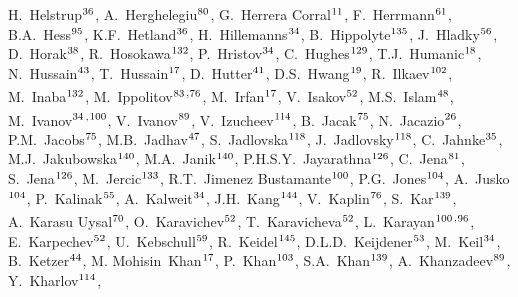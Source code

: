 \begin{flushleft}
H.~Helstrup$^\textrm{\scriptsize 36}$,
A.~Herghelegiu$^\textrm{\scriptsize 80}$,
G.~Herrera Corral$^\textrm{\scriptsize 11}$,
F.~Herrmann$^\textrm{\scriptsize 61}$,
B.A.~Hess$^\textrm{\scriptsize 95}$,
K.F.~Hetland$^\textrm{\scriptsize 36}$,
H.~Hillemanns$^\textrm{\scriptsize 34}$,
B.~Hippolyte$^\textrm{\scriptsize 135}$,
J.~Hladky$^\textrm{\scriptsize 56}$,
D.~Horak$^\textrm{\scriptsize 38}$,
R.~Hosokawa$^\textrm{\scriptsize 132}$,
P.~Hristov$^\textrm{\scriptsize 34}$,
C.~Hughes$^\textrm{\scriptsize 129}$,
T.J.~Humanic$^\textrm{\scriptsize 18}$,
N.~Hussain$^\textrm{\scriptsize 43}$,
T.~Hussain$^\textrm{\scriptsize 17}$,
D.~Hutter$^\textrm{\scriptsize 41}$,
D.S.~Hwang$^\textrm{\scriptsize 19}$,
R.~Ilkaev$^\textrm{\scriptsize 102}$,
M.~Inaba$^\textrm{\scriptsize 132}$,
M.~Ippolitov$^\textrm{\scriptsize 83}$\textsuperscript{,}$^\textrm{\scriptsize 76}$,
M.~Irfan$^\textrm{\scriptsize 17}$,
V.~Isakov$^\textrm{\scriptsize 52}$,
M.S.~Islam$^\textrm{\scriptsize 48}$,
M.~Ivanov$^\textrm{\scriptsize 34}$\textsuperscript{,}$^\textrm{\scriptsize 100}$,
V.~Ivanov$^\textrm{\scriptsize 89}$,
V.~Izucheev$^\textrm{\scriptsize 114}$,
B.~Jacak$^\textrm{\scriptsize 75}$,
N.~Jacazio$^\textrm{\scriptsize 26}$,
P.M.~Jacobs$^\textrm{\scriptsize 75}$,
M.B.~Jadhav$^\textrm{\scriptsize 47}$,
S.~Jadlovska$^\textrm{\scriptsize 118}$,
J.~Jadlovsky$^\textrm{\scriptsize 118}$,
C.~Jahnke$^\textrm{\scriptsize 35}$,
M.J.~Jakubowska$^\textrm{\scriptsize 140}$,
M.A.~Janik$^\textrm{\scriptsize 140}$,
P.H.S.Y.~Jayarathna$^\textrm{\scriptsize 126}$,
C.~Jena$^\textrm{\scriptsize 81}$,
S.~Jena$^\textrm{\scriptsize 126}$,
M.~Jercic$^\textrm{\scriptsize 133}$,
R.T.~Jimenez Bustamante$^\textrm{\scriptsize 100}$,
P.G.~Jones$^\textrm{\scriptsize 104}$,
A.~Jusko$^\textrm{\scriptsize 104}$,
P.~Kalinak$^\textrm{\scriptsize 55}$,
A.~Kalweit$^\textrm{\scriptsize 34}$,
J.H.~Kang$^\textrm{\scriptsize 144}$,
V.~Kaplin$^\textrm{\scriptsize 76}$,
S.~Kar$^\textrm{\scriptsize 139}$,
A.~Karasu Uysal$^\textrm{\scriptsize 70}$,
O.~Karavichev$^\textrm{\scriptsize 52}$,
T.~Karavicheva$^\textrm{\scriptsize 52}$,
L.~Karayan$^\textrm{\scriptsize 100}$\textsuperscript{,}$^\textrm{\scriptsize 96}$,
E.~Karpechev$^\textrm{\scriptsize 52}$,
U.~Kebschull$^\textrm{\scriptsize 59}$,
R.~Keidel$^\textrm{\scriptsize 145}$,
D.L.D.~Keijdener$^\textrm{\scriptsize 53}$,
M.~Keil$^\textrm{\scriptsize 34}$,
B.~Ketzer$^\textrm{\scriptsize 44}$,
M. Mohisin~Khan$^\textrm{\scriptsize 17}$,
P.~Khan$^\textrm{\scriptsize 103}$,
S.A.~Khan$^\textrm{\scriptsize 139}$,
A.~Khanzadeev$^\textrm{\scriptsize 89}$,
Y.~Kharlov$^\textrm{\scriptsize 114}$,

\end{flushleft}

